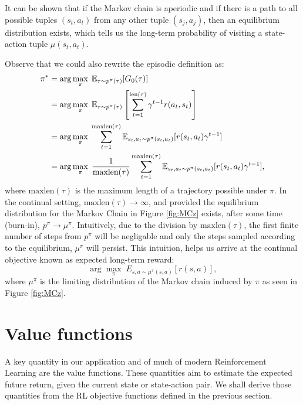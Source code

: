 \documentclass{report}
\numberwithin{equation}{section}
\numberwithin{figure}{section}
\numberwithin{table}{section}
\numberwithin{algorithm}{section}
\begin{document}
It can be shown that if the Markov chain is aperiodic and if there 
is a path to all possible tuples $(s_t, a_t)$ from any other tuple 
$(s_j, a_j)$, then an equilibrium distribution exists, which 
tells us the long-term probability of visiting a state-action tuple 
$\mu(s_t, a_t)$.

Observe that we could also rewrite the episodic definition as:
\begin{align}
  \label{eq:cont_objective}
  \pi^*&=\arg \max_{\pi}\; \mathbb{E}_{\tau\sim p^{\pi}(\tau)}[G_0(\tau)]\notag\\
  &=\arg \max_{\pi}\; \mathbb{E}_{\tau\sim p^{\pi}(\tau)}\left[\sum_{t=1}^{\text{len}(\tau)}\gamma^{t-1}r(a_{t}, s_{t})\right]\notag\\
  &=\arg \max_{\pi}\; \sum_{t=1}^{\text{maxlen}(\tau)}\mathbb{E}_{s_{t}, a_{t}\sim p^{\pi}(s_{t}, a_{t})}[r(s_t, a_t)\gamma^{t-1}]\notag\\
  &=\arg \max_{\pi}\; \frac{1}{\text{maxlen}(\tau)}\sum_{t=1}^{\text{maxlen}(\tau)}\mathbb{E}_{s_{t}, a_{t}\sim p^{\pi}(s_{t}, a_{t})}[r(s_{t}, a_{t})\gamma^{t-1}],
\end{align}
where $\text{maxlen}(\tau)$ is the maximum length of a trajectory possible under $\pi$. 
In the continual setting, $\text{maxlen}(\tau)\rightarrow\infty$, and provided the 
equilibrium distribution for the Markov Chain in Figure 
\ref{fig:MCz} exists, 
after some time (burn-in), $p^{\pi}\rightarrow \mu^{\pi}$. Intuitively,
 due to the division by $\text{maxlen}(\tau)$, 
the first finite number of steps from $p^{\pi}$ 
will be negligable and only the steps sampled according to the equilibrium, 
$\mu^{\pi}$ will persist. This intuition, helps us arrive at the 
continual objective known as expected long-term reward:
\begin{equation}\label{eq:continualObjective}
  \arg \max_{\pi}\; {E}_{s, a\sim \mu^{\pi}(s, a)}[r(s, a)],
\end{equation}
where $\mu^{\pi}$ is the limiting distribution of the Markov chain 
induced by $\pi$ as seen in Figure \ref{fig:MCz}.



\section{Value functions}\label{sec:valueFuncs}
A key quantity in our application and of much of modern Reinforcement Learning 
are the value functions. These quantities aim to estimate the 
expected future return, given the current state or state-action pair. 
We shall derive those quantities from the RL objective functions 
defined in the previous section.
\end{document}
